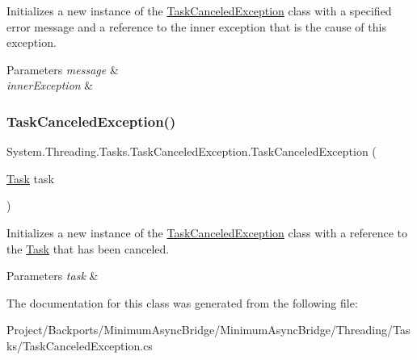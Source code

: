 Initializes a new instance of the \hyperlink{class_system_1_1_threading_1_1_tasks_1_1_task_canceled_exception}{Task\+Canceled\+Exception} class with a specified error message and a reference to the inner exception that is the cause of this exception. 


\begin{DoxyParams}{Parameters}
{\em message} & \\
\hline
{\em inner\+Exception} & \\
\hline
\end{DoxyParams}
\mbox{\label{class_system_1_1_threading_1_1_tasks_1_1_task_canceled_exception_aa766c4047bb9529d6443a702fdd33041}} 
\subsubsection{\texorpdfstring{Task\+Canceled\+Exception()}{TaskCanceledException()}\hspace{0.1cm}{\footnotesize\ttfamily [4/4]}}
{\footnotesize\ttfamily System.\+Threading.\+Tasks.\+Task\+Canceled\+Exception.\+Task\+Canceled\+Exception (\begin{DoxyParamCaption}\item[{\hyperlink{class_system_1_1_threading_1_1_tasks_1_1_task}{Task}}]{task }\end{DoxyParamCaption})\hspace{0.3cm}{\ttfamily [inline]}}



Initializes a new instance of the \hyperlink{class_system_1_1_threading_1_1_tasks_1_1_task_canceled_exception}{Task\+Canceled\+Exception} class with a reference to the \hyperlink{class_system_1_1_threading_1_1_tasks_1_1_task}{Task} that has been canceled. 


\begin{DoxyParams}{Parameters}
{\em task} & \\
\hline
\end{DoxyParams}


The documentation for this class was generated from the following file\+:\begin{DoxyCompactItemize}
\item 
Project/\+Backports/\+Minimum\+Async\+Bridge/\+Minimum\+Async\+Bridge/\+Threading/\+Tasks/Task\+Canceled\+Exception.\+cs\end{DoxyCompactItemize}
